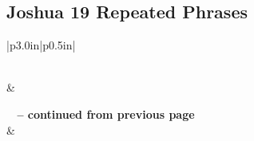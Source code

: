 \subsection{Joshua 19 Repeated Phrases}


\normalsize
 
\begin{center}
\begin{longtable}{|p{3.0in}|p{0.5in}|}
\caption[Joshua 19 Repeated Phrases]{Joshua 19 Repeated Phrases}\label{table:Repeated Phrases Joshua 19} \\
\hline {} &  \\ \hline 
\endfirsthead
 
{{\bfseries \tablename\ \thetable{} -- continued from previous page}} \\  
\hline {} &  \\ \hline 
\endhead
 

\end{longtable}
\end{center}
